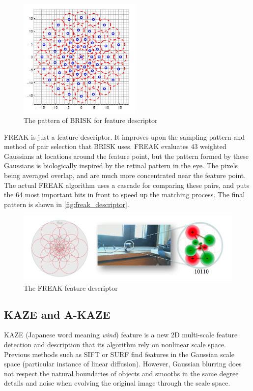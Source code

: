\begin{figure}[H]
  \centering
  \includegraphics[width=60mm]{figures/brisk_descriptor}
  \caption{The pattern of BRISK for feature descriptor}\label{fig:brisk_descriptor}
\end{figure}

FREAK is just a feature descriptor. It improves upon the sampling pattern and method of pair selection that BRISK uses. FREAK evaluates 43 weighted Gaussians at locations around the feature point, but the pattern formed by these Gaussians is biologically inspired by the retinal pattern in the eye. The pixels being averaged overlap, and are much more concentrated near the feature point. The actual FREAK algorithm uses a cascade for comparing these pairs, and puts the 64 most important bits in front to speed up the matching process. The final pattern is shown in \autoref{fig:freak_descriptor}.

\begin{figure}[H]
  \centering
  \includegraphics[width=130mm]{figures/freak_descriptor}
  \caption{The FREAK feature descriptor}\label{fig:freak_descriptor}
\end{figure}


\subsection {KAZE and A-KAZE} \label{subsec:kaze_akaze}
KAZE (Japanese word meaning \emph{wind}) \cite{alcantarilla2012kaze} feature is a new 2D multi-scale feature detection and description that its algorithm rely on nonlinear scale space. Previous methods such as SIFT or SURF find features in the Gaussian scale space (particular instance of linear diffusion). However, Gaussian blurring does not respect the natural boundaries of objects and smooths in the same degree details and noise when evolving the original image through the scale space.

